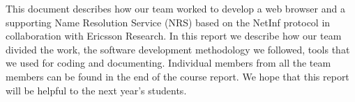 This document describes how our team worked to develop a web browser and a supporting
Name Resolution Service (NRS) based on the NetInf protocol in collaboration with Ericsson Research. 
In this report we describe how our team divided the work, the software development methodology we followed, 
tools that we used for coding and documenting. Individual members from all the team members can be
found in the end of the course report. We hope that this report will be helpful to the next year's students.